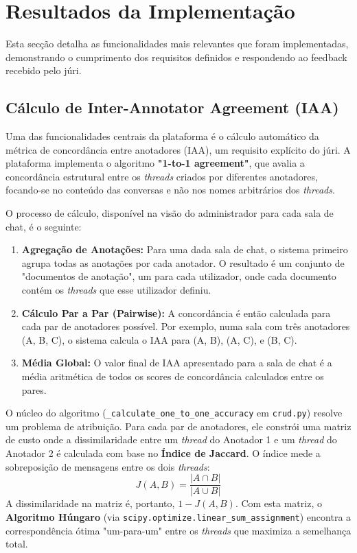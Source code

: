 \section{Resultados da Implementação}

Esta secção detalha as funcionalidades mais relevantes que foram implementadas, demonstrando o cumprimento dos requisitos definidos e respondendo ao feedback recebido pelo júri.

\subsection{Cálculo de Inter-Annotator Agreement (IAA)}

Uma das funcionalidades centrais da plataforma é o cálculo automático da métrica de concordância entre anotadores (IAA), um requisito explícito do júri. A plataforma implementa o algoritmo \textbf{"1-to-1 agreement"}, que avalia a concordância estrutural entre os \textit{threads} criados por diferentes anotadores, focando-se no conteúdo das conversas e não nos nomes arbitrários dos \textit{threads}.

O processo de cálculo, disponível na visão do administrador para cada sala de chat, é o seguinte:
\begin{enumerate}
    \item \textbf{Agregação de Anotações:} Para uma dada sala de chat, o sistema primeiro agrupa todas as anotações por cada anotador. O resultado é um conjunto de "documentos de anotação", um para cada utilizador, onde cada documento contém os \textit{threads} que esse utilizador definiu.
    \item \textbf{Cálculo Par a Par (Pairwise):} A concordância é então calculada para cada par de anotadores possível. Por exemplo, numa sala com três anotadores (A, B, C), o sistema calcula o IAA para (A, B), (A, C), e (B, C).
    \item \textbf{Média Global:} O valor final de IAA apresentado para a sala de chat é a média aritmética de todos os scores de concordância calculados entre os pares.
\end{enumerate}

O núcleo do algoritmo (\texttt{\_calculate\_one\_to\_one\_accuracy} em \texttt{crud.py}) resolve um problema de atribuição. Para cada par de anotadores, ele constrói uma matriz de custo onde a dissimilaridade entre um \textit{thread} do Anotador 1 e um \textit{thread} do Anotador 2 é calculada com base no \textbf{Índice de Jaccard}. O índice mede a sobreposição de mensagens entre os dois \textit{threads}:
\[ J(A, B) = \frac{|A \cap B|}{|A \cup B|} \]
A dissimilaridade na matriz é, portanto, \(1 - J(A, B)\). Com esta matriz, o \textbf{Algoritmo Húngaro} (via \texttt{scipy.optimize.linear\_sum\_assignment}) encontra a correspondência ótima "um-para-um" entre os \textit{threads} que maximiza a semelhança total.

